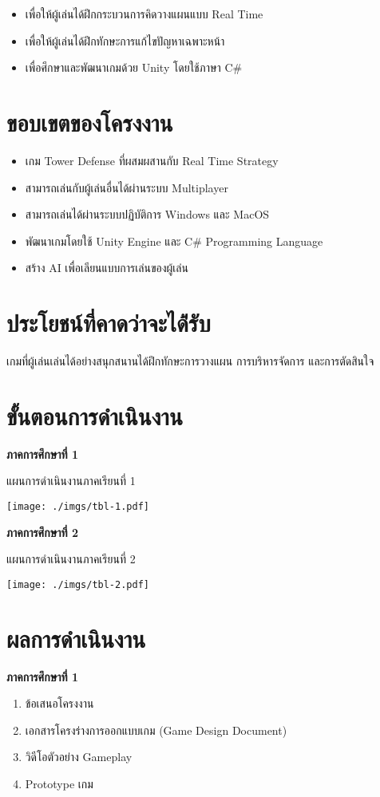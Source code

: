 \documentclass[12pt,oneside,openright,a4paper]{cpe-thai-project}
\begin{document}
\begin{itemize}
\item เพื่อให้ผู้เล่นได้ฝึกกระบวนการคิดวางแผนแบบ Real Time 
\item เพื่อให้ผู้เล่นได้ฝึกทักษะการแก้ไขปัญหาเฉพาะหน้า
\item เพื่อศึกษาและพัฒนาเกมด้วย Unity โดยใช้ภาษา C\#
\end{itemize}


\section{ขอบเขตของโครงงาน}

\begin{itemize}
\item  เกม Tower Defense ที่ผสมผสานกับ Real Time Strategy
\item  สามารถเล่นกับผู้เล่นอื่นได้ผ่านระบบ Multiplayer 
\item  สามารถเล่นได้ผ่านระบบปฏิบัติการ Windows และ MacOS
\item  พัฒนาเกมโดยใช้ Unity Engine และ C\# Programming Language 
\item  สร้าง AI เพื่อเลียนแบบการเล่นของผู้เล่น 
\end{itemize}


\section{ประโยชน์ที่คาดว่าจะได้่รับ}

เกมที่ผู้เล่นเล่นได้อย่างสนุกสนานได้ฝึกทักษะการวางแผน การบริหารจัดการ และการตัดสินใจ

\pagebreak
\section{ขั้นตอนการดำเนินงาน}
\textbf{ภาคการศึกษาที่ 1}
\begin{table}[H]
  \caption{แผนการดำเนินงานภาคเรียนที่ 1}\label{tbl:tab-1}
  \texttt{[image: ./imgs/tbl-1.pdf]}
\end{table}

\textbf{ภาคการศึกษาที่ 2}
\begin{table}[H]
  \caption{แผนการดำเนินงานภาคเรียนที่ 2}\label{tbl:tab-2}
  \texttt{[image: ./imgs/tbl-2.pdf]}
\end{table}

\pagebreak
\section{ผลการดำเนินงาน}
\textbf{ภาคการศึกษาที่ 1}
\begin{enumerate}
  \item ข้อเสนอโครงงาน
  \item เอกสารโครงร่างการออกแบบเกม (Game Design Document) 
  \item วิดีโอตัวอย่าง Gameplay
  \item Prototype เกม
  
\end{enumerate}
\end{document}
